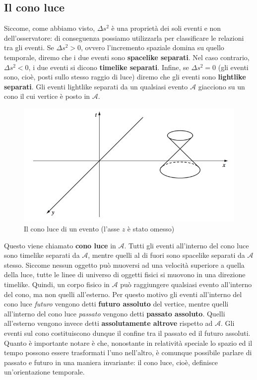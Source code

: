 \documentclass[a4paper,11pt]{book}
\theoremstyle{plain}
\theoremstyle{definition}
\begin{document}
\subsection{Il cono luce}
Siccome, come abbiamo visto, $\Delta s^2$ è una proprietà dei soli eventi e non dell'osservatore: di conseguenza possiamo utilizzarla per classificare le relazioni tra gli eventi. Se $\Delta s^2>0$, ovvero l'incremento spaziale domina su quello temporale, diremo che i due eventi sono \textbf{spacelike separati}. Nel caso contrario, $\Delta s^2<0$, i due eventi si dicono \textbf{timelike separati}. Infine, se $\Delta s^2=0$ (gli eventi sono, cioè, posti sullo stesso raggio di luce) diremo che gli eventi sono \textbf{lightlike separati}. Gli eventi lightlike separati da un qualsiasi evento $\mathcal{A}$ giacciono su un cono il cui vertice è posto in $\mathcal{A}$. 
\begin{figure}[!h]
\centering
\includegraphics[scale=0.45]{conoluce}
\caption{Il cono luce di un evento (l'asse $z$ è stato omesso)}
\end{figure}
Questo viene chiamato \textbf{cono luce} in $\mathcal{A}$. Tutti gli eventi all'interno del cono luce sono timelike separati da $\mathcal{A}$, mentre quelli al di fuori sono spacelike separati da $\mathcal{A}$ stesso. Siccome nessun oggetto può muoversi ad una velocità superiore a quella della luce, tutte le linee di universo di oggetti fisici si muovono in una direzione timelike. Quindi, un corpo fisico in $\mathcal{A}$ può raggiungere qualsiasi evento all'interno del cono, ma non quelli all'esterno. Per questo motivo gli eventi all'interno del cono luce \emph{futuro} vengono detti \textbf{futuro assoluto} del vertice, mentre quelli all'interno del cono luce \emph{passato} vengono detti \textbf{passato assoluto}. Quelli all'esterno vengono invece detti  \textbf{assolutamente altrove} rispetto ad $\mathcal{A}$. Gli eventi sul cono costituiscono dunque il confine tra il passato ed il futuro assoluti. Quanto è importante notare è che, nonostante in relatività speciale lo spazio ed il tempo possono essere trasformati l'uno nell'altro, è comunque possibile parlare di passato e futuro in una maniera invariante: il cono luce, cioè, definisce un'orientazione temporale. 
\end{document}
